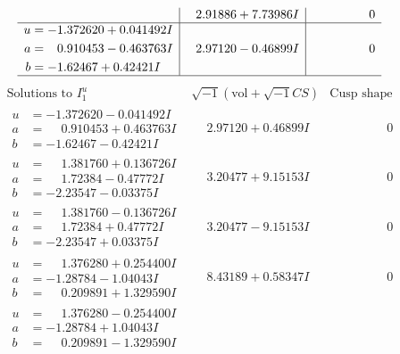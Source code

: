 \documentclass[1p]{elsarticle_modified}
\theoremstyle{definition}
\newcommand{\I}{\sqrt{-1}}
\begin{document}
$$\begin{array}{c|c|c}
 & \phantom{-}2.91886 + 7.73986 I & \phantom{-0.000000 } 0 \\ \hline\begin{aligned}
u &= -1.372620 + 0.041492 I \\
a &= \phantom{-}0.910453 - 0.463763 I \\
b &= -1.62467 + 0.42421 I\end{aligned}
 & \phantom{-}2.97120 - 0.46899 I & \phantom{-0.000000 } 0\\
 \hline 
 \end{array}$$\newpage$$\begin{array}{c|c|c}  
\text{Solutions to }I^u_{1}& \I (\text{vol} + \sqrt{-1}CS) & \text{Cusp shape}\\
 \hline 
\begin{aligned}
u &= -1.372620 - 0.041492 I \\
a &= \phantom{-}0.910453 + 0.463763 I \\
b &= -1.62467 - 0.42421 I\end{aligned}
 & \phantom{-}2.97120 + 0.46899 I & \phantom{-0.000000 } 0 \\ \hline\begin{aligned}
u &= \phantom{-}1.381760 + 0.136726 I \\
a &= \phantom{-}1.72384 - 0.47772 I \\
b &= -2.23547 - 0.03375 I\end{aligned}
 & \phantom{-}3.20477 + 9.15153 I & \phantom{-0.000000 } 0 \\ \hline\begin{aligned}
u &= \phantom{-}1.381760 - 0.136726 I \\
a &= \phantom{-}1.72384 + 0.47772 I \\
b &= -2.23547 + 0.03375 I\end{aligned}
 & \phantom{-}3.20477 - 9.15153 I & \phantom{-0.000000 } 0 \\ \hline\begin{aligned}
u &= \phantom{-}1.376280 + 0.254400 I \\
a &= -1.28784 - 1.04043 I \\
b &= \phantom{-}0.209891 + 1.329590 I\end{aligned}
 & \phantom{-}8.43189 + 0.58347 I & \phantom{-0.000000 } 0 \\ \hline\begin{aligned}
u &= \phantom{-}1.376280 - 0.254400 I \\
a &= -1.28784 + 1.04043 I \\
b &= \phantom{-}0.209891 - 1.329590 I\end{aligned}

\end{array}$$
\end{document}
